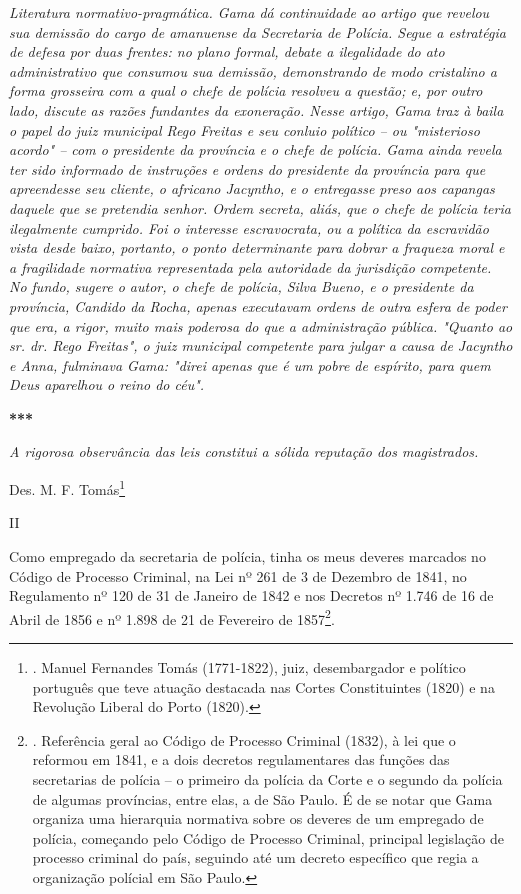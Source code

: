 \emph{Literatura normativo-pragmática. Gama dá continuidade ao artigo
que revelou sua demissão do cargo de amanuense da Secretaria de Polícia.
Segue a estratégia de defesa por duas frentes: no plano formal, debate a
ilegalidade do ato administrativo que consumou sua demissão,
demonstrando de modo cristalino a forma grosseira com a qual o chefe de
polícia resolveu a questão; e, por outro lado, discute as razões
fundantes da exoneração. Nesse artigo, Gama traz à baila o papel do juiz
municipal Rego Freitas e seu conluio político -- ou "misterioso acordo"
-- com o presidente da província e o chefe de polícia. Gama ainda revela
ter sido informado de instruções e ordens do presidente da província
para que apreendesse seu cliente, o africano Jacyntho, e o entregasse
preso aos capangas daquele que se pretendia senhor. Ordem secreta,
aliás, que o chefe de polícia teria ilegalmente cumprido. Foi o
interesse escravocrata, ou a política da escravidão vista desde baixo,
portanto, o ponto determinante para dobrar a fraqueza moral e a
fragilidade normativa representada pela autoridade da jurisdição
competente. No fundo, sugere o autor, o chefe de polícia, Silva Bueno, e
o presidente da província, Candido da Rocha, apenas executavam ordens de
outra esfera de poder que era, a rigor, muito mais poderosa do que a
administração pública. "Quanto ao sr. dr. Rego Freitas", o juiz
municipal competente para julgar a causa de Jacyntho e Anna, fulminava
Gama: "direi apenas que é um pobre de espírito, para quem Deus aparelhou
o reino do céu".}

\textbf{***}

\emph{A rigorosa observância das leis constitui a sólida reputação dos
magistrados.}

Des. M. F. Tomás\footnote{. Manuel Fernandes Tomás (1771-1822), juiz,
  desembargador e político português que teve atuação destacada nas
  Cortes Constituintes (1820) e na Revolução Liberal do Porto (1820).}

II

Como empregado da secretaria de polícia, tinha os meus deveres marcados
no Código de Processo Criminal, na Lei nº 261 de 3 de Dezembro de 1841,
no Regulamento nº 120 de 31 de Janeiro de 1842 e nos Decretos nº 1.746
de 16 de Abril de 1856 e nº 1.898 de 21 de Fevereiro de 1857\footnote{.
  Referência geral ao Código de Processo Criminal (1832), à lei que o
  reformou em 1841, e a dois decretos regulamentares das funções das
  secretarias de polícia -- o primeiro da polícia da Corte e o segundo
  da polícia de algumas províncias, entre elas, a de São Paulo. É de se
  notar que Gama organiza uma hierarquia normativa sobre os deveres de
  um empregado de polícia, começando pelo Código de Processo Criminal,
  principal legislação de processo criminal do país, seguindo até um
  decreto específico que regia a organização polícial em São Paulo.}.

